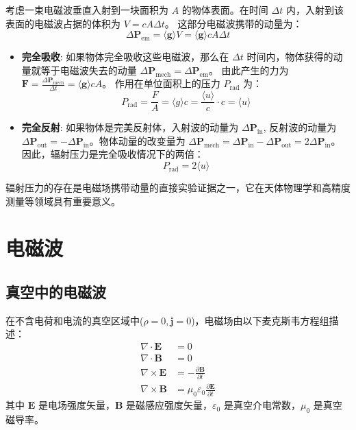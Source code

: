 \documentclass[fontset=none]{ctexart}
\begin{document}
考虑一束电磁波垂直入射到一块面积为 $A$ 的物体表面。在时间 $\Delta t$ 内，入射到该表面的电磁波占据的体积为 $V = c A \Delta t$。
这部分电磁波携带的动量为：
\begin{equation}
    \Delta \bm{P}_{\text{em}} = \langle \bm{g} \rangle V = \langle \bm{g} \rangle c A \Delta t
\end{equation}
\begin{itemize}
    \item \textbf{完全吸收}: 如果物体完全吸收这些电磁波，那么在 $\Delta t$ 时间内，物体获得的动量就等于电磁波失去的动量 $\Delta \bm{P}_{\text{mech}} = \Delta \bm{P}_{\text{em}}$。
    由此产生的力为 $\bm{F} = \frac{\Delta \bm{P}_{\text{mech}}}{\Delta t} = \langle \bm{g} \rangle c A$。
    作用在单位面积上的压力 $P_{\text{rad}}$ 为：
    \begin{equation}
        P_{\text{rad}} = \frac{F}{A} = \langle g \rangle c = \frac{\langle u \rangle}{c} \cdot c = \langle u \rangle
    \end{equation}
    \item \textbf{完全反射}: 如果物体是完美反射体，入射波的动量为 $\Delta \bm{P}_{\text{in}}$, 反射波的动量为 $\Delta \bm{P}_{\text{out}} = -\Delta \bm{P}_{\text{in}}$。物体动量的改变量为 $\Delta \bm{P}_{\text{mech}} = \Delta \bm{P}_{\text{in}} - \Delta \bm{P}_{\text{out}} = 2 \Delta \bm{P}_{\text{in}}$。
    因此，辐射压力是完全吸收情况下的两倍：
    \begin{equation}
        P_{\text{rad}} = 2 \langle u \rangle
    \end{equation}
\end{itemize}
辐射压力的存在是电磁场携带动量的直接实验证据之一，它在天体物理学和高精度测量等领域具有重要意义。

\section{电磁波}

\subsection{真空中的电磁波}

\begin{definition}[真空中的麦克斯韦方程组]
在不含电荷和电流的真空区域中($\rho=0, \bm{j}=0$)，电磁场由以下麦克斯韦方程组描述：
\begin{align}
\nabla \cdot \bm{E} &= 0 \\
\nabla \cdot \bm{B} &= 0 \\
\nabla \times \bm{E} &= -\frac{\partial \bm{B}}{\partial t} \label{eq:faraday} \\
\nabla \times \bm{B} &= \mu_0 \varepsilon_0 \frac{\partial \bm{E}}{\partial t} \label{eq:ampere}
\end{align}
其中 $\bm{E}$ 是电场强度矢量，$\bm{B}$ 是磁感应强度矢量，$\varepsilon_0$ 是真空介电常数，$\mu_0$ 是真空磁导率。
\end{definition}
\end{document}
